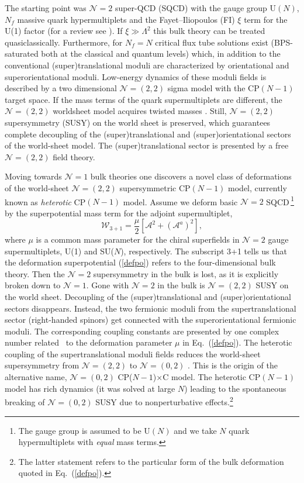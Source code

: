 \documentclass[12pt]{article}
\def\beq{\begin{equation}}
\def\eeq{\end{equation}}
\newcommand{\ntwo}{${\mathcal N}=2$ }
\newcommand{\ntwot}{${\mathcal N}= \left(2,2\right) $ }
\newcommand{\ntwoo}{${\mathcal N}= \left(0,2\right) $ }
\newcommand{\none}{${\mathcal N}=1$ }
\newcommand{\nonen}{${\mathcal N}=1$}
\newcommand{\CPC}{CP($N-1$)$\times$C }
\begin{document}
The starting point was \cite{ABEKY,SYmon,HT2} \ntwo super-QCD (SQCD) with the gauge group U$(N)$,
$N_f$ massive quark hypermultiplets and the Fayet--Iliopoulos (FI) $\xi$ term for the U(1) factor
(for a review see \cite{SYrev}). If $\xi\gg\Lambda^2$
this bulk theory can be treated quasiclassically. Furthermore, 
for $N_f=N$  critical flux tube solutions exist (BPS-saturated both
at the classical and quantum levels) which, in addition to the conventional
(super)translational moduli are characterized by orientational and superorientational moduli.
Low-energy dynamics of these moduli fields is described by
a two dimensional \ntwot sigma model with the CP$(N-1)$ target space. If the mass terms of 
the quark supermultiplets are different, the \ntwot worldsheet model acquires twisted masses
\cite{twisted}. Still, \ntwot supersymmetry (SUSY) on the world sheet is preserved, which guarantees
complete decoupling of the (super)translational and (super)orientational sectors
of the world-sheet model. The (super)translational sector is presented by a free \ntwot field
theory.

Moving towards \none bulk theories one discovers \cite{Edalati,SYhet,BSYhet}
 a novel class of deformations
of the world-sheet \ntwot supersymmetric CP$(N-1)$ model, currently known as 
{\em heterotic} CP$(N-1)$ model. Assume we deform  basic \ntwo SQCD\,\footnote{
The  gauge group is assumed to be U$(N)$ and we take $N$   quark hypermultiplets
with {\em equal} mass terms.}
 by the superpotential mass term for the adjoint supermultiplet,
\beq
{\mathcal W}_{3+1}=\frac{\mu}{2} \left[{\mathcal A}^2
+  ({\mathcal A}^a)^2\right],
\label{defpo}
\eeq
where $\mu$ is a common mass parameter for the chiral
superfields in \ntwo gauge supermultiplets,
U(1) and SU($N$), respectively. The subscript 3+1 tells us that the deformation 
superpotential (\ref{defpo}) refers to the four-dimensional bulk theory.
Then the \ntwo supersymmetry in the bulk is lost, as it is explicitly broken down to \nonen.
Gone with \ntwo in the bulk is \ntwot SUSY on the world sheet.
Decoupling of the (super)translational and (super)orientational sectors disappears.
Instead, the two fermionic moduli from the supertranslational sector (right-handed spinors)
get connected with the superorientational fermionic moduli.
The corresponding coupling constants are  presented by one complex number \cite{Edalati}
related~\cite{SYhet,BSYhet} to the deformation parameter $\mu$
in Eq.~(\ref{defpo}).
The heterotic coupling of the
supertranslational moduli fields reduces the world-sheet supersymmetry from
\ntwot to \ntwoo$\!\!$.
This is the origin of the alternative name,
 \ntwoo \CPC model. The heterotic CP$(N-1)$ model has rich dynamics (it was solved \cite{SYhetlN}
 at large $N$) leading to the spontaneous breaking of 
 \ntwoo SUSY due to nonperturbative effects.\footnote{The latter statement refers to the particular
 form of the bulk deformation quoted in Eq.~(\ref{defpo}).} 
 
\end{document}
